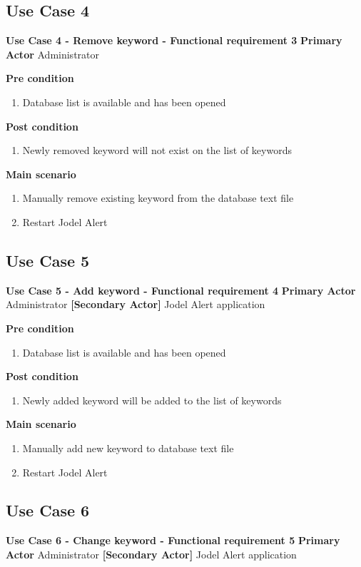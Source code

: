 \documentclass[a4paper,12pt]{article}
\begin{document}
\subsection{Use Case 4}
\textbf{Use Case 4 - Remove keyword - Functional requirement 3}
\textbf{Primary Actor}
Administrator

\textbf{Pre condition}
\begin{enumerate}
	\item Database list is available and has been opened
\end{enumerate}
\textbf{Post condition}
\begin{enumerate}
	\item Newly removed keyword will not exist on the list of keywords
\end{enumerate}

\textbf{Main scenario}
\begin{enumerate}
	\item Manually remove existing keyword from the database text file
	\item Restart Jodel Alert
\end{enumerate}

\subsection{Use Case 5}
\textbf{Use Case 5 - Add keyword - Functional requirement 4}
\textbf{Primary Actor}
Administrator
\textbf{[Secondary Actor]}
Jodel Alert application

\textbf{Pre condition}
\begin{enumerate}
	\item Database list is available and has been opened
\end{enumerate}
\textbf{Post condition}
\begin{enumerate}
	\item Newly added keyword will be added to the list of keywords
\end{enumerate}

\textbf{Main scenario}
\begin{enumerate}
	\item Manually add new keyword to database text file
	\item Restart Jodel Alert
\end{enumerate}

\subsection{Use Case 6}
\textbf{Use Case 6 - Change keyword - Functional requirement 5}
\textbf{Primary Actor}
Administrator
\textbf{[Secondary Actor]}
Jodel Alert application
\end{document}

